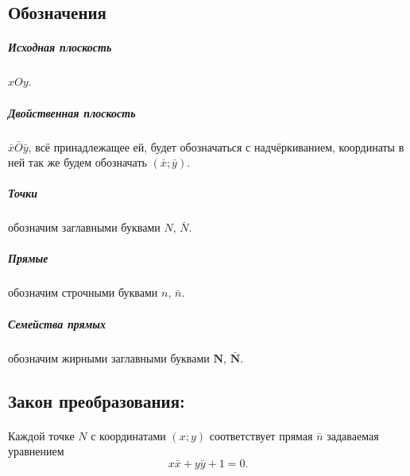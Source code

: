 
\subsection{Обозначения}
\subparagraph{Исходная плоскость} $xOy$.
\subparagraph{Двойственная плоскость} $\bar{x}\bar{O}\bar{y}$, всё принадлежащее ей, будет обозначаться с надчёркиванием, координаты в ней так же будем обозначать $(\bar{x}; \bar{y})$.
\subparagraph{Точки} обозначим заглавными буквами $N$, $\bar{N}$.
\subparagraph{Прямые} обозначим строчными буквами $n$, $\bar{n}$.
\subparagraph{Семейства прямых} обозначим жирными заглавными буквами $\mathbf{N}$, $\mathbf{\bar{N}}$.

\subsection{Закон преобразования:}
\paragraph{}Каждой точке $N$ с координатами $(x; y)$ соответствует прямая $\bar{n}$ задаваемая уравнением 
$$x\bar{x} + y\bar{y} + 1 = 0.$$